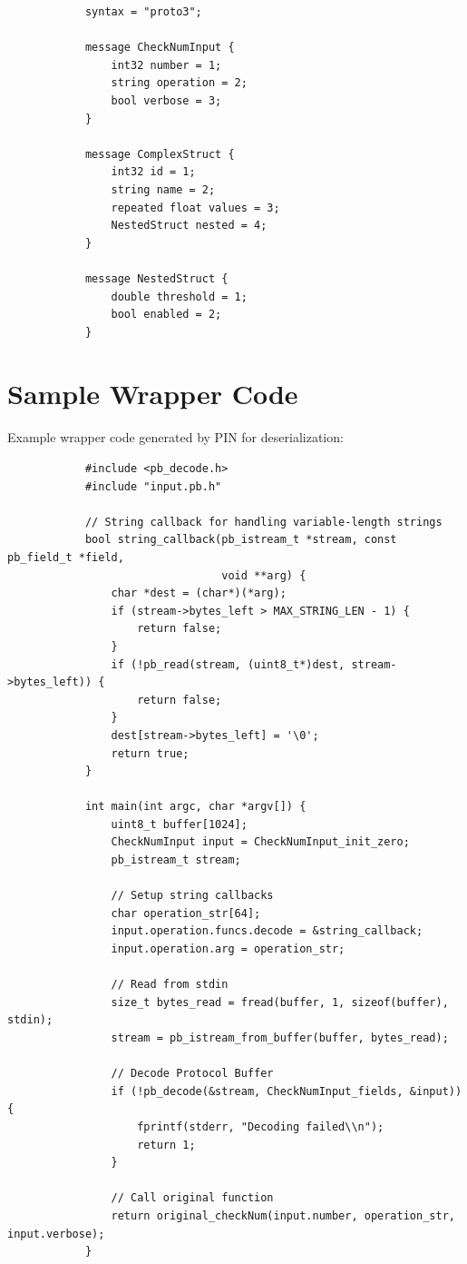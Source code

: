 \documentclass[doublespace,nopageskip]{VTthesis} %
\begin{document}
\begin{appendices}
			\begin{verbatim}
			syntax = "proto3";
			
			message CheckNumInput {
			    int32 number = 1;
			    string operation = 2;
			    bool verbose = 3;
			}
			
			message ComplexStruct {
			    int32 id = 1;
			    string name = 2;
			    repeated float values = 3;
			    NestedStruct nested = 4;
			}
			
			message NestedStruct {
			    double threshold = 1;
			    bool enabled = 2;
			}
			\end{verbatim}
			
			\section{Sample Wrapper Code} \label{ase:sample_wrapper}
			Example wrapper code generated by PIN for deserialization:
			
			\begin{verbatim}
			#include <pb_decode.h>
			#include "input.pb.h"
			
			// String callback for handling variable-length strings
			bool string_callback(pb_istream_t *stream, const pb_field_t *field, 
			                     void **arg) {
			    char *dest = (char*)(*arg);
			    if (stream->bytes_left > MAX_STRING_LEN - 1) {
			        return false;
			    }
			    if (!pb_read(stream, (uint8_t*)dest, stream->bytes_left)) {
			        return false;
			    }
			    dest[stream->bytes_left] = '\0';
			    return true;
			}
			
			int main(int argc, char *argv[]) {
			    uint8_t buffer[1024];
			    CheckNumInput input = CheckNumInput_init_zero;
			    pb_istream_t stream;
			    
			    // Setup string callbacks
			    char operation_str[64];
			    input.operation.funcs.decode = &string_callback;
			    input.operation.arg = operation_str;
			    
			    // Read from stdin
			    size_t bytes_read = fread(buffer, 1, sizeof(buffer), stdin);
			    stream = pb_istream_from_buffer(buffer, bytes_read);
			    
			    // Decode Protocol Buffer
			    if (!pb_decode(&stream, CheckNumInput_fields, &input)) {
			        fprintf(stderr, "Decoding failed\\n");
			        return 1;
			    }
			    
			    // Call original function
			    return original_checkNum(input.number, operation_str, input.verbose);
			}
			\end{verbatim}
	\end{appendices}
\end{document}
